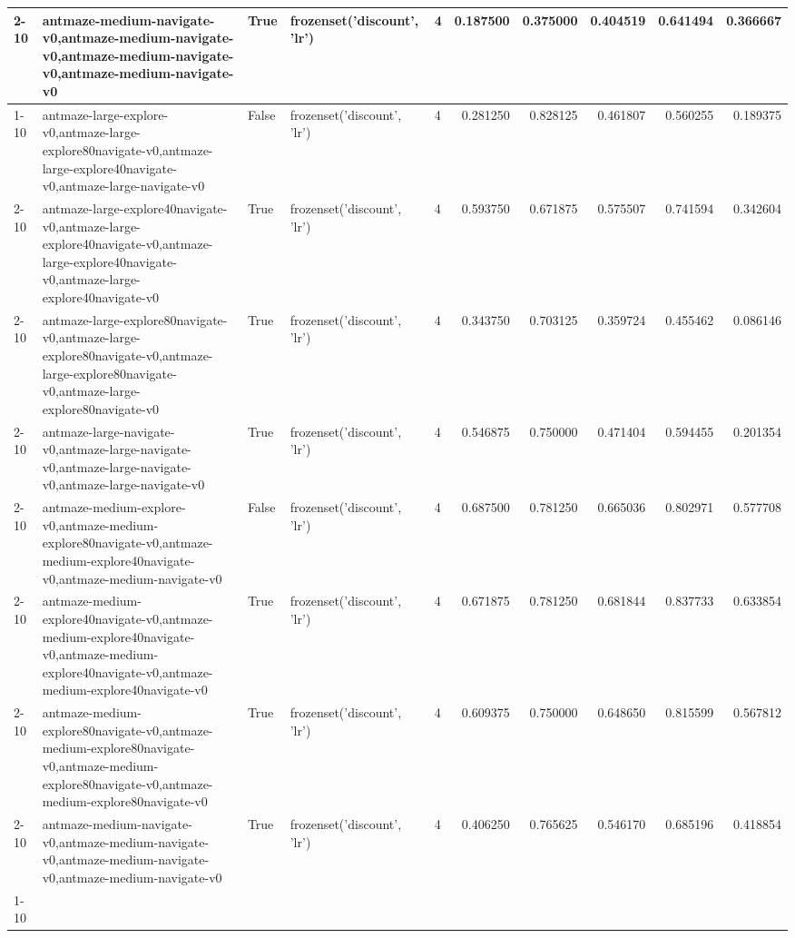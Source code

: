 \begin{tabular}{lllllrrrrr}
\cline{2-10} \cline{3-10} \cline{4-10}
 & antmaze-medium-navigate-v0,antmaze-medium-navigate-v0,antmaze-medium-navigate-v0,antmaze-medium-navigate-v0 & True & frozenset({'discount', 'lr'}) & 4 & 0.187500 & 0.375000 & 0.404519 & 0.641494 & 0.366667 \\
\cline{1-10} \cline{2-10} \cline{3-10} \cline{4-10}
\multirow[t]{8}{*}{QRL} & antmaze-large-explore-v0,antmaze-large-explore80navigate-v0,antmaze-large-explore40navigate-v0,antmaze-large-navigate-v0 & False & frozenset({'discount', 'lr'}) & 4 & 0.281250 & 0.828125 & 0.461807 & 0.560255 & 0.189375 \\
\cline{2-10} \cline{3-10} \cline{4-10}
 & antmaze-large-explore40navigate-v0,antmaze-large-explore40navigate-v0,antmaze-large-explore40navigate-v0,antmaze-large-explore40navigate-v0 & True & frozenset({'discount', 'lr'}) & 4 & 0.593750 & 0.671875 & 0.575507 & 0.741594 & 0.342604 \\
\cline{2-10} \cline{3-10} \cline{4-10}
 & antmaze-large-explore80navigate-v0,antmaze-large-explore80navigate-v0,antmaze-large-explore80navigate-v0,antmaze-large-explore80navigate-v0 & True & frozenset({'discount', 'lr'}) & 4 & 0.343750 & 0.703125 & 0.359724 & 0.455462 & 0.086146 \\
\cline{2-10} \cline{3-10} \cline{4-10}
 & antmaze-large-navigate-v0,antmaze-large-navigate-v0,antmaze-large-navigate-v0,antmaze-large-navigate-v0 & True & frozenset({'discount', 'lr'}) & 4 & 0.546875 & 0.750000 & 0.471404 & 0.594455 & 0.201354 \\
\cline{2-10} \cline{3-10} \cline{4-10}
 & antmaze-medium-explore-v0,antmaze-medium-explore80navigate-v0,antmaze-medium-explore40navigate-v0,antmaze-medium-navigate-v0 & False & frozenset({'discount', 'lr'}) & 4 & 0.687500 & 0.781250 & 0.665036 & 0.802971 & 0.577708 \\
\cline{2-10} \cline{3-10} \cline{4-10}
 & antmaze-medium-explore40navigate-v0,antmaze-medium-explore40navigate-v0,antmaze-medium-explore40navigate-v0,antmaze-medium-explore40navigate-v0 & True & frozenset({'discount', 'lr'}) & 4 & 0.671875 & 0.781250 & 0.681844 & 0.837733 & 0.633854 \\
\cline{2-10} \cline{3-10} \cline{4-10}
 & antmaze-medium-explore80navigate-v0,antmaze-medium-explore80navigate-v0,antmaze-medium-explore80navigate-v0,antmaze-medium-explore80navigate-v0 & True & frozenset({'discount', 'lr'}) & 4 & 0.609375 & 0.750000 & 0.648650 & 0.815599 & 0.567812 \\
\cline{2-10} \cline{3-10} \cline{4-10}
 & antmaze-medium-navigate-v0,antmaze-medium-navigate-v0,antmaze-medium-navigate-v0,antmaze-medium-navigate-v0 & True & frozenset({'discount', 'lr'}) & 4 & 0.406250 & 0.765625 & 0.546170 & 0.685196 & 0.418854 \\
\cline{1-10} \cline{2-10} \cline{3-10} \cline{4-10}
\bottomrule
\end{tabular}
